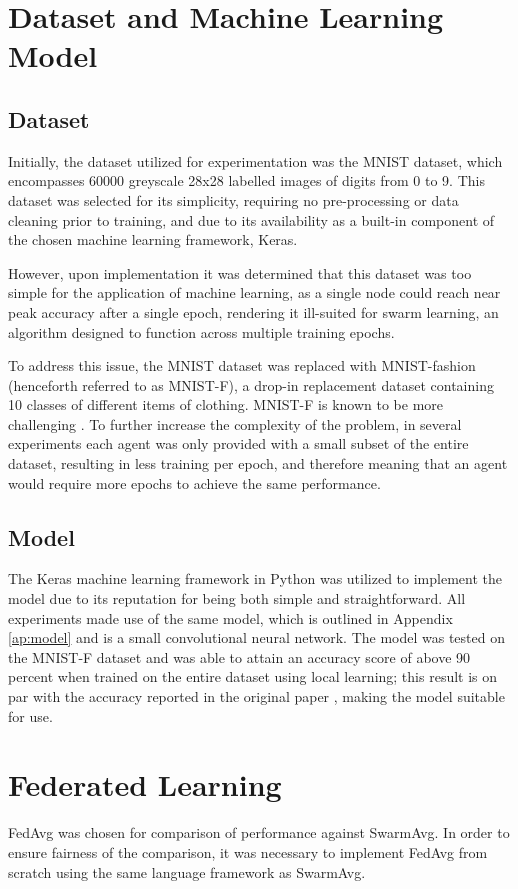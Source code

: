 \section{Dataset and Machine Learning Model}
\subsection{Dataset}
Initially, the dataset utilized for experimentation was the MNIST dataset, which encompasses 60000 greyscale 28x28 labelled images of digits from 0 to 9. This dataset was selected for its simplicity, requiring no pre-processing or data cleaning prior to training, and due to its availability as a built-in component of the chosen machine learning framework, Keras.

However, upon implementation it was determined that this dataset was too simple for the application of machine learning, as a single node could reach near peak accuracy after a single epoch, rendering it ill-suited for swarm learning, an algorithm designed to function across multiple training epochs.

To address this issue, the MNIST dataset was replaced with MNIST-fashion (henceforth referred to as MNIST-F), a drop-in replacement dataset containing 10 classes of different items of clothing. MNIST-F is known to be more challenging \cite{xiao2017fashionmnist}. To further increase the complexity of the problem, in several experiments each agent was only provided with a small subset of the entire dataset, resulting in less training per epoch, and therefore meaning that an agent would require more epochs to achieve the same performance.

\subsection{Model}
The Keras machine learning framework in Python was utilized to implement the model due to its reputation for being both simple and straightforward. All experiments made use of the same model, which is outlined in Appendix \ref{ap:model} and is a small convolutional neural network. The model was tested on the MNIST-F dataset and was able to attain an accuracy score of above 90 percent when trained on the entire dataset using local learning; this result is on par with the accuracy reported in the original paper \cite{xiao2017fashionmnist}, making the model suitable for use.


\section{Federated Learning}
FedAvg was chosen for comparison of performance against SwarmAvg. In order to ensure fairness of the comparison, it was necessary to implement FedAvg from scratch using the same language framework as SwarmAvg.
